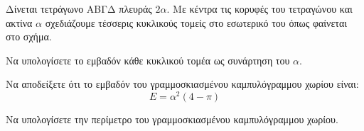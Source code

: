 Δίνεται τετράγωνο ΑΒΓΔ πλευράς $2\alpha$. Με κέντρα τις κορυφές του τετραγώνου και ακτίνα $\alpha$ σχεδιάζουμε τέσσερις κυκλικούς τομείς στο εσωτερικό του όπως φαίνεται στο σχήμα.

\begin{alist}
\item Να υπολογίσετε το εμβαδόν κάθε κυκλικού τομέα ως συνάρτηση του $\alpha$. 
\item Να αποδείξετε ότι το εμβαδόν του γραμμοσκιασμένου καμπυλόγραμμου χωρίου είναι:
\[ E = \alpha^2(4 - \pi) \] 
\item Να υπολογίσετε την περίμετρο του γραμμοσκιασμένου καμπυλόγραμμου χωρίου. 
\end{alist}